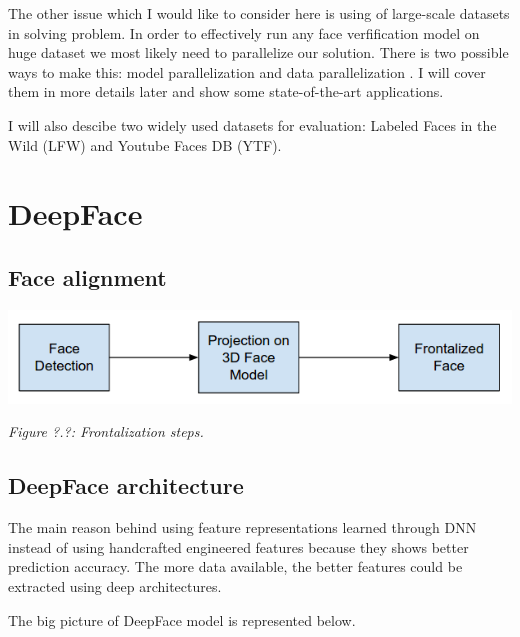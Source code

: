\documentclass[paper=a4, fontsize=11pt]{scrartcl} %
\numberwithin{equation}{section} %
\numberwithin{figure}{section} %
\numberwithin{table}{section} %
\begin{document}
The other issue which I would like to consider here is using of large-scale datasets in solving problem. In order to effectively run any face verfification model on huge dataset we most likely need to parallelize our solution. There is two possible ways to make this: model parallelization and data parallelization \cite{dean2012large}. I will cover them in more details later and show some state-of-the-art applications. \par


I will also descibe two widely used datasets for evaluation: Labeled Faces in the Wild (LFW) and Youtube Faces DB (YTF).

\section{DeepFace}

\subsection{Face alignment}

\begin{center}
\includegraphics[scale=0.5]{pictures/front.png}
\par\large\textit{Figure ?.?: Frontalization steps.}
\end{center}

\subsection{DeepFace architecture}

The main reason behind using feature representations learned through DNN instead of using handcrafted engineered features because they shows better prediction accuracy.  The more data available, the better features could be extracted using deep architectures. \par
The big picture of DeepFace model is represented below. \par
\end{document}
